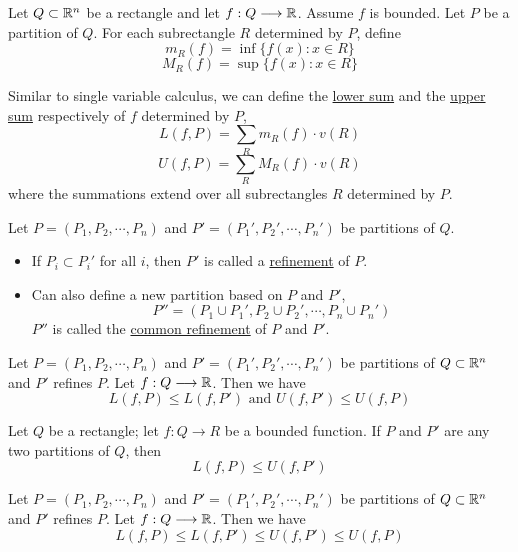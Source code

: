 \begin{definition}
    Let $Q\subset \mathbb{R}^n$ be a rectangle and let $f:Q\longrightarrow \mathbb{R}$. Assume $f$ is bounded. Let $P$ be a partition of $Q$. For each subrectangle $R$ determined by $P$, define
    $$m_R(f)=\inf\{f(x): x\in R\}$$
    $$M_R(f)=\sup\{f(x): x\in R\}$$
\end{definition}

\begin{definition}
    Similar to single variable calculus, we can define the \underline{lower sum} and the \underline{upper sum} respectively of $f$ determined by $P$,
    $$L(f,P)=\sum_Rm_R(f)\cdot v(R)$$
    $$U(f,P)=\sum_RM_R(f)\cdot v(R)$$
    where the summations extend over all subrectangles $R$ determined by $P$.
\end{definition}

\begin{definition}
    Let $P=(P_1,P_2,\cdots,P_n)$ and $P'=(P_1',P_2',\cdots,P_n')$ be partitions of $Q$.
    \begin{itemize}
        \item If $P_i \subset P_i'$ for all $i$, then $P'$ is called a \underline{refinement} of $P$.
        \item Can also define a new partition based on $P$ and $P'$,
        $$P''=(P_1 \cup P_1',P_2\cup P_2',\cdots,P_n\cup P_n')$$
        $P''$ is called the \underline{common refinement} of $P$ and $P'$.
    \end{itemize}
\end{definition}

\begin{lemma}
    Let $P=(P_1,P_2,\cdots,P_n)$ and $P'=(P_1',P_2',\cdots,P_n')$ be partitions of $Q\subset \mathbb{R}^n$ and $P'$ refines $P$. Let $f:Q\longrightarrow \mathbb{R}$. Then we have
    $$L(f,P)\leq L(f,P') \text{ and }U(f,P')\leq U(f,P)$$
\end{lemma}


\begin{lemma}
    Let $Q$ be a rectangle; let $f:Q\longrightarrow R$ be a bounded function. If $P$ and $P'$ are any two partitions of $Q$, then
    $$L(f,P)\leq U(f,P')$$
\end{lemma}


\begin{theorem}
    Let $P=(P_1,P_2,\cdots,P_n)$ and $P'=(P_1',P_2',\cdots,P_n')$ be partitions of $Q\subset \mathbb{R}^n$ and $P'$ refines $P$. Let $f:Q\longrightarrow \mathbb{R}$. Then we have
    $$L(f,P)\leq L(f,P') \leq U(f,P')\leq U(f,P)$$
\end{theorem}


